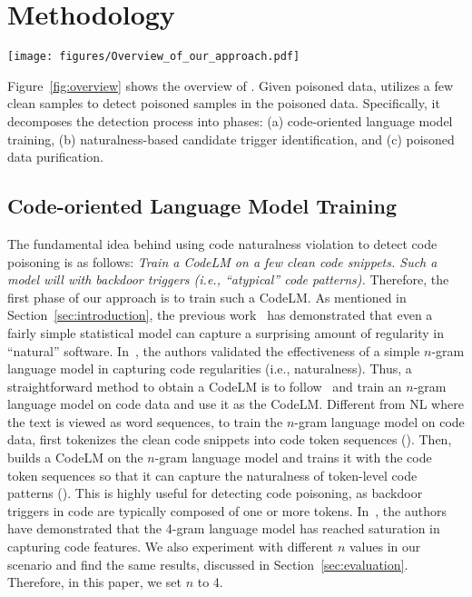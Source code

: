 \section{Methodology}
\label{sec:methodology}

\begin{figure*}[t]
    \centering
    \texttt{[image: figures/Overview\_of\_our\_approach.pdf]}
    \vspace{-2mm}
    \caption{Overview of \ours{}}
    \label{fig:overview}
    \vspace{-4mm}
\end{figure*}


Figure~\ref{fig:overview} shows the overview of \ours{}. 
Given poisoned data, \ours{} utilizes a few clean samples to detect poisoned samples in the poisoned data. Specifically, it decomposes the detection process into  phases: (a) code-oriented language model training, (b) naturalness-based candidate trigger identification, and (c) poisoned data purification.


\subsection{Code-oriented Language Model Training}
\label{subsec:code-oriented_language_model_training}
The fundamental idea behind using code naturalness violation to detect code poisoning is as follows: \textit{Train a CodeLM on a few clean code snippets. Such a model will  with backdoor triggers (i.e., ``atypical'' code patterns).} 
Therefore, the first phase of our approach is to train such a CodeLM. 
As mentioned in Section~\ref{sec:introduction}, the previous work~\cite{2012-On-the-naturalness-of-software} has demonstrated that even a fairly simple statistical model can capture a surprising amount of regularity in ``natural'' software. 
In~\cite{2012-On-the-naturalness-of-software}, the authors validated the effectiveness of a simple $n$-gram language model in capturing code regularities (i.e., naturalness). Thus, a straightforward method to obtain a CodeLM is to follow~\cite{2012-On-the-naturalness-of-software} and train an $n$-gram language model on code data and use it as the CodeLM. 
Different from NL where the text is viewed as word sequences, to train the $n$-gram language model on code data, \ours{} first tokenizes the clean code snippets into code token sequences (). Then, \ours{} builds a CodeLM on the $n$-gram language model and trains it with the code token sequences so that it can capture the naturalness of token-level code patterns (). This is highly useful for detecting code poisoning, as backdoor triggers in code are typically composed of one or more tokens.
In~\cite{2012-On-the-naturalness-of-software}, the authors have demonstrated that the 4-gram language model has reached saturation in capturing code features. 
We also experiment with different $n$ values in our scenario and find the same results, discussed in Section~\ref{sec:evaluation}. Therefore, in this paper, we set $n$ to 4.
 

